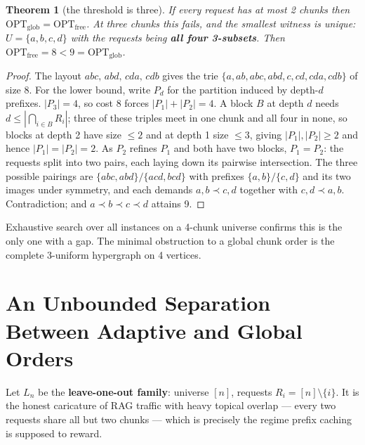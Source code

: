 \documentclass[11pt]{article}
\theoremstyle{plain}
\newtheorem{theorem}{Theorem}
\begin{document}
\begin{theorem}[the threshold is three]
If every request has at most 2 chunks then $\mathrm{OPT}_{\mathrm{glob}} = \mathrm{OPT}_{\mathrm{free}}$. At three chunks this fails, and the smallest witness is unique: $U = \{a,b,c,d\}$ with the requests being \textbf{all four 3-subsets}. Then $\mathrm{OPT}_{\mathrm{free}} = 8 < 9 = \mathrm{OPT}_{\mathrm{glob}}$.
\end{theorem}
\begin{proof}
The layout $abc,\, abd,\, cda,\, cdb$ gives the trie $\{a, ab, abc, abd, c, cd, cda, cdb\}$ of size 8. For the lower bound, write $P_d$ for the partition induced by depth-$d$ prefixes. $|P_3| = 4$, so cost 8 forces $|P_1|+|P_2| = 4$. A block $B$ at depth $d$ needs $d \le |\bigcap_{i\in B}R_i|$; three of these triples meet in one chunk and all four in none, so blocks at depth 2 have size $\le 2$ and at depth 1 size $\le 3$, giving $|P_1|,|P_2|\ge 2$ and hence $|P_1| = |P_2| = 2$. As $P_2$ refines $P_1$ and both have two blocks, $P_1 = P_2$: the requests split into two pairs, each laying down its pairwise intersection. The three possible pairings are $\{abc,abd\}/\{acd,bcd\}$ with prefixes $\{a,b\}/\{c,d\}$ and its two images under symmetry, and each demands $a,b \prec c,d$ together with $c,d \prec a,b$. Contradiction; and $a\prec b \prec c \prec d$ attains 9. 
\end{proof}

Exhaustive search over all instances on a 4-chunk universe confirms this is the only one with a gap. The minimal obstruction to a global chunk order is the complete 3-uniform hypergraph on 4 vertices.


\section{An Unbounded Separation Between Adaptive and Global Orders}

Let $L_n$ be the \textbf{leave-one-out family}: universe $[n]$, requests $R_i = [n]\setminus\{i\}$. It is the honest caricature of RAG traffic with heavy topical overlap --- every two requests share all but two chunks --- which is precisely the regime prefix caching is supposed to reward.
\end{document}
